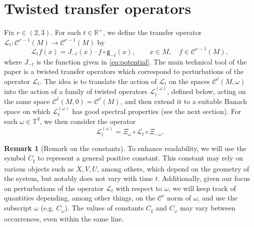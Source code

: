 \documentclass[11pt,letterpaper]{amsart}
\newcommand \cL {{\mathcal L}}
\newcommand \R {{ \mathbb R}}
\newcommand \T {{ \mathbb T}}
\newcommand \cC {{\mathscr{C}}}
\newcommand \sC {{C_\sharp}}
\newcommand{\geo}{\mathsf{g}}
\theoremstyle{definition}
\newtheorem{remark}[theorem]{Remark}
\begin{document}

\section{Twisted transfer operators}\label{sec:twisted_transfer_operators}


Fix $r\in(2,3)$. 
For each $t \in \R^+$, we define the transfer operator $\cL_t: \cC^{r-1}(M)\to \cC^{r-1}(M)$ by
\[
\cL_{t}f(x)= J_{-t}(x)\cdot f\circ \geo_{-t}(x), \qquad x\in M, \quad f\in \cC^{r-1}(M),
\]
where $J_{-t}$ is the function given in \eqref{eq:potential}.
 The main technical tool of the paper is a twisted transfer operators which correspond to perturbations of the operator $\cL_t$. The idea is to translate the action of $\cL_t$ on the spaces $\mathscr{C}^\ell(M,\omega)$ into the action of a family of twisted operators $\cL^{(\omega)}_t$, defined below, acting on the same space $\mathscr{C}^\ell(M,0)=\mathscr{C}^\ell(M)$, and then extend it to a suitable Banach space on which $\cL_t^{(\omega)}$ has good spectral properties (see the next section).
 For each $\omega \in \T^d$, we then consider the operator
\begin{equation}\label{eq:TTO}
\cL^{(\omega)}_t=\Xi_{\omega} \circ  \cL_t \circ \Xi_{-\omega}.
\end{equation}
\begin{remark}[Remark on the constants]\label{rmk:constant} To enhance readability, we will use the symbol $\sC$ to represent a general positive constant. This constant may rely on various objects such as $X, V, U$, among others, which depend on the geometry of the system, but notably does not vary with time $t$. Additionally, given our focus on perturbations of the operator $\cL_t$ with respect to $\omega$, we will keep track of quantities depending, among other things, on the $\cC^r$ norm of $\omega$, and use the subscript $\omega$ (e.g. $C_{\omega}$). The values of constants $\sC$ and $C_\omega$ may vary between occurrences, even within the same line.
\end{remark}
\end{document}
